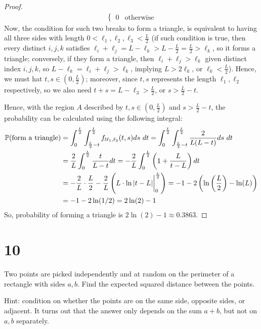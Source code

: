 \documentclass{article}
\begin{document}
\begin{proof}
\begin{align}
\begin{cases}
            0 & \text{otherwise}
        \end{cases}
    \end{align}
    Now, the condition for such two breaks to form a triangle, is equivalent to having all three sides with length $0<\ell_1,\ell_2,\ell_3<\frac{L}{2}$ (if such condition is true, then every distinct $i,j,k$ satisfies $\ell_i+\ell_j = L-\ell_k > L-\frac{L}{2}=\frac{L}{2}>\ell_k$, so it forms a triangle; conversely, if they form a triangle, then $\ell_i+\ell_j>\ell_k$ given distinct index $i,j,k$, so $L-\ell_k = \ell_i+\ell_j>\ell_k$, implying $L>2\ell_k$, or $\ell_k<\frac{L}{2}$). Hence, we must hat $t,s\in (0,\frac{L}{2})$; moreover, since $t,s$ represents the length $\ell_1,\ell_2$ respectively, so we also need $t+s = L-\ell_3 > \frac{L}{2}$, or $s>\frac{L}{2}-t$. 

    Hence, with the region $A$ described by $t,s\in (0,\frac{L}{2})$ and $s>\frac{L}{2}-t$, the probability can be calculated using the following integral:
    \begin{align}
        \PP(\text{form a triangle})&=\int_{0}^{\frac{L}{2}}\int_{\frac{L}{2}-t}^{\frac{L}{2}}f_{l\ell_1,\ell_2}(t,s)ds\ dt = \int_{0}^{\frac{L}{2}}\int_{\frac{L}{2}-t}^{\frac{L}{2}}\frac{2}{L(L-t)}ds\ dt\\
        &= \frac{2}{L}\int_{0}^{\frac{L}{2}}\frac{t}{L-t}dt = -\frac{2}{L}\int_{0}^{\frac{L}{2}}\left(1+\frac{L}{t-L}\right)dt\\
        &= -\frac{2}{L}\cdot\frac{L}{2} - \frac{2}{L}\left(L\cdot\ln|t-L|\bigg|_{0}^{\frac{L}{2}}\right) = -1 - 2\left(\ln\left(\frac{L}{2}\right)-\ln(L)\right)\\
        &= -1-2\ln(1/2) = 2\ln(2)-1
    \end{align}
    So, probability of forming a triangle is $2\ln(2)-1\approx 0.3863$.
\end{proof}

\newpage

\section*{10}
\begin{ques}\label{q9}
    Two points are picked independently and at random on the perimeter of a rectangle with sides $a,b$. Find the expected squared distance between the points. 

    Hint: condition on whether the points are on the same side, opposite sides, or adjacent. It turns out that the answer only depends on the sum $a+b$, but not on $a,b$ separately.
\end{ques}
\end{document}
